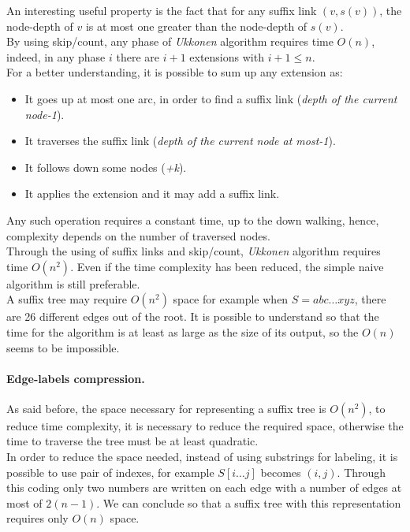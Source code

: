 
An interesting useful property is the fact that for any suffix link $(v, s(v))$, the node-depth of $v$ is at most one greater than the node-depth of $s(v)$.\\
By using  skip/count, any phase of 
\textit{Ukkonen} algorithm requires time $O(n)$, indeed, in any phase $i$ there are $i+1$ extensions with $i+1 \leq n$.\\
For a better understanding, it is possible to sum up any extension as:
\begin{itemize}
	\item It goes up at most one arc, in order to find a suffix link (\textit{depth of the current node-1}).
	\item It traverses the suffix link (\textit{depth of the current node at most-1}).
	\item It follows down some nodes (\textit{+k}).
	\item It applies the extension and it may add a suffix link.
\end{itemize}
Any such operation requires a constant time, up to the down walking, hence, complexity depends on the number of traversed nodes.\\
Through the using of suffix links and skip/count, \textit{Ukkonen} algorithm requires time $O(n^2)$. Even if the time complexity has been reduced, the simple naive algorithm is still preferable.\\
A suffix tree may require $O(n^2)$ space for example when $S=abc \dots xyz$, there are 26 different edges out of the root. It is possible to understand so that the time for the algorithm is at least as large as the size of its output, so the $O(n)$ seems to be impossible.

\paragraph*{Edge-labels compression.} As said before, the space necessary for representing a suffix tree is $O(n^2)$, to reduce time complexity, it is necessary to reduce the required space, otherwise the time to traverse the tree must be at least quadratic.\\
In order to reduce the space needed, instead of using substrings for labeling, it is possible to use pair of indexes, for example $S[i \dots j]$ becomes $(i,j)$. 
Through this coding only two numbers are written on each edge with a number of edges at most of $2(n-1)$. We can conclude so that a suffix tree with this representation requires only $O(n)$ space.

